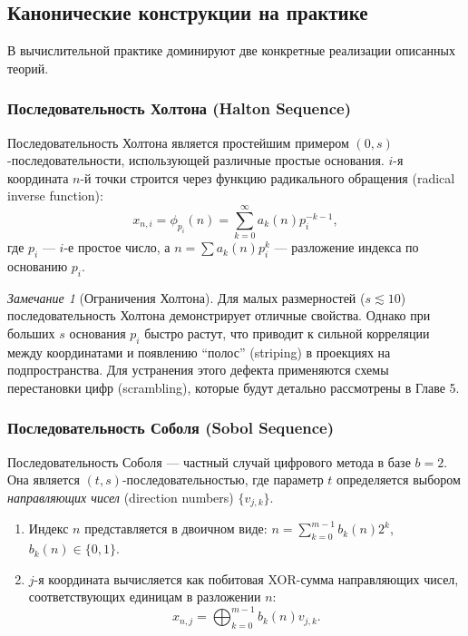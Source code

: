 \documentclass[12pt, a4paper]{article}
\theoremstyle{plain}
\theoremstyle{definition}
\theoremstyle{remark}
\newtheorem{remark}[theorem]{Замечание}
\begin{document}
\subsection{Канонические конструкции на практике}
В вычислительной практике доминируют две конкретные реализации описанных теорий.

\subsubsection{Последовательность Холтона (Halton Sequence)}
Последовательность Холтона является простейшим примером $(0,s)$-последовательности, использующей различные простые основания. $i$-я координата $n$-й точки строится через функцию радикального обращения (radical inverse function):
\begin{equation}
    x_{n,i} = \phi_{p_i}(n) = \sum_{k=0}^{\infty} a_k(n) p_i^{-k-1},
\end{equation}
где $p_i$ --- $i$-е простое число, а $n = \sum a_k(n) p_i^k$ --- разложение индекса по основанию $p_i$.

\begin{remark}[Ограничения Холтона]
    Для малых размерностей ($s \lesssim 10$) последовательность Холтона демонстрирует отличные свойства. Однако при больших $s$ основания $p_i$ быстро растут, что приводит к сильной корреляции между координатами и появлению ``полос'' (striping) в проекциях на подпространства. Для устранения этого дефекта применяются схемы перестановки цифр (scrambling), которые будут детально рассмотрены в Главе 5.
\end{remark}

\subsubsection{Последовательность Соболя (Sobol Sequence)}
Последовательность Соболя --- частный случай цифрового метода в базе $b=2$. Она является $(t,s)$-последовательностью, где параметр $t$ определяется выбором \textit{направляющих чисел} (direction numbers) $\{v_{j,k}\}$.

\begin{enumerate}
    \item Индекс $n$ представляется в двоичном виде: $n = \sum_{k=0}^{m-1} b_k(n) 2^k$, $b_k(n) \in \{0,1\}$.
    \item $j$-я координата вычисляется как побитовая XOR-сумма направляющих чисел, соответствующих единицам в разложении $n$:
    \begin{equation}
        x_{n,j} = \bigoplus_{k=0}^{m-1} b_k(n) v_{j,k}.
    \end{equation}
\end{enumerate}
\end{document}
